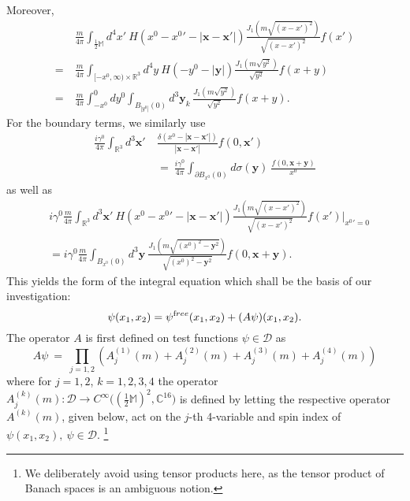\documentclass[b5paper,draft,openbib,12pt]{memoir}
\newcommand{\R}{\mathbb{R}}
\newcommand{\CC}{\mathbb{C}}
\newcommand{\M}{\mathbb{M}}
\newcommand{\vx}{\mathbf{x}}
\newcommand{\vy}{\mathbf{y}}
\newcommand{\free}{{\textup free}}
\begin{document}
Moreover,
\begin{align}
	&\frac{m}{4\pi} \int_{\tfrac{1}{2}\M} \!\! d^4 x' ~ H(x^0 - {x^0}' - |\vx-\vx'|) \frac{J_1(m\sqrt{(x-x')^2})}{\sqrt{(x-x')^2}} f(x')\nonumber\\
= ~& \frac{m}{4\pi} \int_{[-x^0,\infty) \times \R^3} \!\!\!\! d^4 y ~ H(-y^0- |\vy|) \frac{J_1(m\sqrt{y^2})}{\sqrt{y^2}} f(x +y)\nonumber\\
= ~& \frac{m}{4\pi} \int_{-x^0}^0 dy^0 \int_{B_{|y^0|}(0)} d^3 \vy_k \, \frac{J_1(m\sqrt{y^2})}{\sqrt{y^2}} f(x+y).
\end{align}
For the boundary terms, we similarly use
\begin{align}
   \frac{i \gamma^0}{4\pi} \int_{\R^3}d^3 \vx'& ~ \frac{\delta(x^0-|\vx-\vx'|)}{|\vx-\vx'|}f(0,\vx') \\
   &~=~ \frac{i \gamma^0}{4\pi} \int_{\partial B_{x^0}(0)}d\sigma(\vy) ~ \frac{f(0,\vx+\vy)}{x^0}
  \end{align}
as well as
\begin{align}
	&i \gamma^0\frac{m}{4\pi} \int_{\R^3}d^3 \vx' ~ H(x^0 - {x^0}' - |\vx-\vx'|) \frac{J_1(m\sqrt{(x-x')^2})}{\sqrt{(x-x')^2}} f(x')|_{{x^0}' = 0}\nonumber\\
&= i \gamma^0\frac{m}{4\pi} \int_{B_{x^0}(0)}d^3 \vy ~ \frac{J_1(m\sqrt{(x^0)^2 - \vy^2})}{\sqrt{(x^0)^2 - \vy^2}} f(0,\vx+\vy).
\end{align}
This yields the form of the integral equation which shall be the basis of our investigation:
\begin{equation}
	\psi(x_1,x_2) = \psi^\free(x_1,x_2) + (A \psi)(x_1,x_2).
\label{eq:inteqschematic}
\end{equation}
The operator $A$ is first defined on test functions $\psi \in \mathscr{D}$ as
\begin{equation}
	A\psi ~=~ \prod_{j=1,2} \left(A_j^{(1)}(m) + A_j^{(2)}(m) + A_j^{(3)}(m) + A_j^{(4)}(m)\right)
 \label{eq:defa}   
\end{equation}
where for $j=1,2$, $k=1,2,3,4$ the operator \\
\(A_j^{(k)}(m) : \mathscr{D} \rightarrow C^\infty\big((\frac{1}{2}\M)^2,\CC^{16}\big)\)  
is defined by letting the respective operator $A^{(k)}(m)$, given 
below, act on the $j$-th 4-variable and spin index of 
$\psi(x_1,x_2),~ \psi \in \mathscr{D}$.
\footnote{We deliberately avoid using tensor products here, as 
the tensor product of Banach spaces is an ambiguous notion.}
\end{document}
